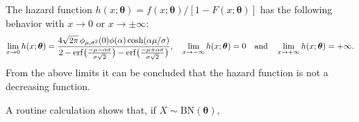 \documentclass[12pt]{article}
\theoremstyle{definition}
\begin{document}
The hazard function $h(x;\boldsymbol{\theta})=f(x;\boldsymbol{\theta})/[1-F(x;\boldsymbol{\theta})]$ has the following behavior with $x\to 0$ or $x \to \pm\infty$:
\begin{align*}
\lim_{x\to 0} h(x;\boldsymbol{\theta})
=
{4\sqrt{2\pi}\, 
\phi_{\mu,\sigma^2}(0) 
\phi(\alpha) 
\cosh({\alpha\mu/\sigma})
\over 
2- {\rm erf}\big({-\mu-\alpha\sigma\over\sigma\sqrt{2}}\big)
-
{\rm erf}\big({-\mu+\alpha\sigma\over\sigma\sqrt{2} }\big)
},
\quad 
\lim_{x\to -\infty} h(x;\boldsymbol{\theta})=0
\quad \text{and} \quad
\lim_{x\to +\infty} h(x;\boldsymbol{\theta})=+\infty.
\end{align*}
From the above limits it can be concluded that the hazard function is not a decreasing function.

\smallskip 
A routine calculation shows that, if $X\sim \text{BN}(\boldsymbol{\theta})$,
\end{document}
